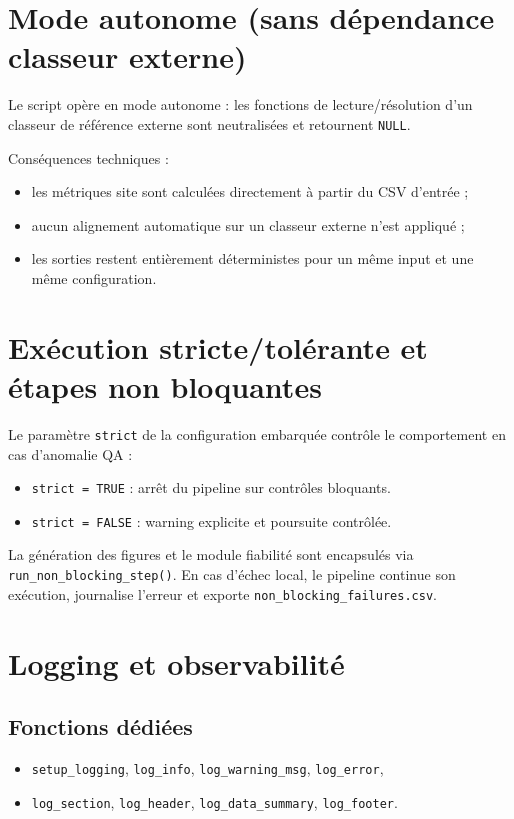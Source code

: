 \documentclass[11pt,a4paper]{article}
\begin{document}
\section{Mode autonome (sans d\'ependance classeur externe)}
Le script opère en mode autonome : les fonctions de lecture/r\'esolution d'un
classeur de r\'ef\'erence externe sont neutralis\'ees et retournent \texttt{NULL}.

Cons\'equences techniques :
\begin{itemize}[leftmargin=1.2cm]
  \item les m\'etriques site sont calcul\'ees directement à partir du CSV d'entr\'ee ;
  \item aucun alignement automatique sur un classeur externe n'est appliqu\'e ;
  \item les sorties restent entièrement d\'eterministes pour un même input et une même configuration.
\end{itemize}

\section{Ex\'ecution stricte/tol\'erante et \'etapes non bloquantes}
Le paramètre \texttt{strict} de la configuration embarqu\'ee contrôle le comportement en cas d'anomalie QA :
\begin{itemize}[leftmargin=1.2cm]
  \item \texttt{strict = TRUE} : arrêt du pipeline sur contrôles bloquants.
  \item \texttt{strict = FALSE} : warning explicite et poursuite contrôl\'ee.
\end{itemize}

La g\'en\'eration des figures et le module fiabilit\'e sont encapsul\'es via
\texttt{run\_non\_blocking\_step()}. En cas d'\'echec local, le pipeline continue son exécution, journalise l'erreur et exporte \texttt{non\_blocking\_failures.csv}.

\section{Logging et observabilit\'e}
\subsection{Fonctions d\'edi\'ees}
\begin{itemize}[leftmargin=1.2cm]
  \item \texttt{setup\_logging}, \texttt{log\_info}, \texttt{log\_warning\_msg}, \texttt{log\_error},
  \item \texttt{log\_section}, \texttt{log\_header}, \texttt{log\_data\_summary}, \texttt{log\_footer}.
\end{itemize}
\end{document}
